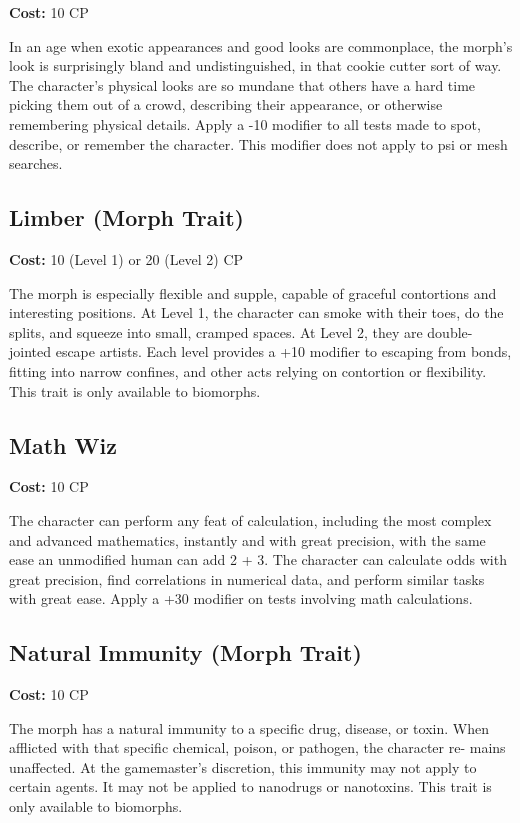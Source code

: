 \textbf{Cost:} 10 CP

In an age when exotic appearances and good looks are commonplace, the morph’s look is surprisingly bland and undistinguished, in that cookie cutter sort of way. The character’s physical looks are so mundane that others have a hard time picking them out of a crowd, describing their appearance, or otherwise remembering physical details. Apply a -10 modifier to all tests made to spot, describe, or remember the character. This modifier does not apply to psi or mesh searches.

\subsection{Limber (Morph Trait)}
\label{sec:traits-limber}

\textbf{Cost:} 10 (Level 1) or 20 (Level 2) CP

The morph is especially flexible and supple, capable of graceful contortions and interesting positions. At Level 1, the character can smoke with their toes, do the splits, and squeeze into small, cramped spaces. At Level 2, they are double-jointed escape artists. Each level provides a +10 modifier to escaping from bonds, fitting into narrow confines, and other acts relying on contortion or flexibility. This trait is only available to biomorphs.

\subsection{Math Wiz}
\label{sec:traits-mathwiz}
\textbf{Cost:} 10 CP

The character can perform any feat of calculation, including the most complex and advanced mathematics, instantly and with great precision, with the same ease an unmodified human can add 2 + 3. The character can calculate odds with great precision, find correlations in numerical data, and perform similar tasks with great ease. Apply a +30 modifier on tests involving math calculations.

\subsection{Natural Immunity (Morph Trait)}
\label{sec:traits-natural-immunity}

\textbf{Cost:} 10 CP

The morph has a natural immunity to a specific drug, disease, or toxin. When afflicted with that specific chemical, poison, or pathogen, the character re- mains unaffected. At the gamemaster’s discretion, this immunity may not apply to certain agents. It may not be applied to nanodrugs or nanotoxins. This trait is only available to biomorphs.

